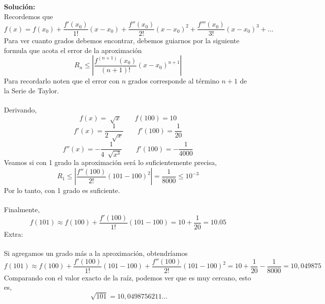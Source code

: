 \documentclass[12pt]{article}
\newenvironment{solucion}
{\begin{mdframed}[backgroundcolor=black!10]
		{\bf Solución:}\\
	}
	{
	\end{mdframed}
}
\newenvironment{preguntas}
{\begin{enumerate}\itemsep12pt
	}
	{
	\end{enumerate}
}
\begin{document}
\begin{preguntas}
\begin{solucion}
Recordemos que
$$f(x) = f(x_0) + \dfrac{f'(x_0)}{1!}(x-x_0) + \dfrac{f''(x_0)}{2!}(x-x_0)^2 + \dfrac{f'''(x_0)}{3!}(x-x_0)^3 + \dots$$
Para ver cuanto grados debemos encontrar, debemos guiarnos por la siguiente formula que acota el error de la aproximación
$$R_n \leq \left|\dfrac{f^{(n+1)}(x_0)}{(n+1)!}(x-x_0)^{n+1}\right|$$
Para recordarlo noten que el error con $n$ grados corresponde al término $n+1$ de la Serie de Taylor.\\
\\
Derivando,
$$f(x) = \sqrt[]{x} \qquad f(100) = 10$$
$$f'(x) = \dfrac{1}{2\ \sqrt[]{x}} \qquad f'(100) = \dfrac{1}{20}$$
$$f''(x) = -\dfrac{1}{4\ \sqrt[]{x^3}} \qquad f'(100) = -\dfrac{1}{4000}$$
Veamos si con 1 grado la aproximación será lo suficientemente precisa,
$$R_1 \leq \left|\dfrac{f''(100)}{2!}(101-100)^{2}\right| = \dfrac{1}{8000} \leq 10^{-3}$$
Por lo tanto, con 1 grado es suficiente.\\
\\
Finalmente,
$$f(101) \approx f(100) + \dfrac{f'(100)}{1!}(101-100) = 10 + \dfrac{1}{20} = 10.05$$
Extra:\\
\\
Si agregamos un grado más a la aproximación, obtendríamos
{\small $$f(101) \approx f(100) + \dfrac{f'(100)}{1!}(101-100) + \dfrac{f''(100)}{2!}(101-100)^2 = 10 + \dfrac{1}{20} - \dfrac{1}{8000} = 10,049875$$}
Comparando con el valor exacto de la raíz, podemos ver que es muy cercano, esto es,
$$\sqrt[]{101} = 10,0498756211...$$
\end{solucion}
\end{preguntas}
\end{document}
